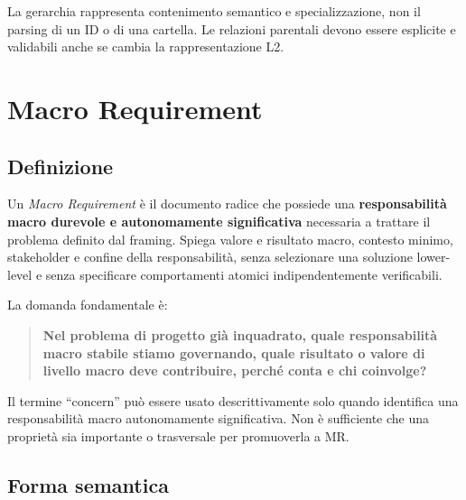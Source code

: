 \documentclass[12pt,a4paper,oneside]{report}
\newcommand{\mr}{\textit{Macro Requirement}}
\begin{document}
La gerarchia rappresenta contenimento semantico e specializzazione, non il parsing di un ID o di una cartella. Le relazioni parentali devono essere esplicite e validabili anche se cambia la rappresentazione L2.

\section{Macro Requirement}

\subsection{Definizione}

Un \mr{} è il documento radice che possiede una \textbf{responsabilità macro durevole e autonomamente significativa} necessaria a trattare il problema definito dal framing. Spiega valore e risultato macro, contesto minimo, stakeholder e confine della responsabilità, senza selezionare una soluzione lower-level e senza specificare comportamenti atomici indipendentemente verificabili.

La domanda fondamentale è:
\begin{quote}
\textbf{Nel problema di progetto già inquadrato, quale responsabilità macro stabile stiamo governando, quale risultato o valore di livello macro deve contribuire, perché conta e chi coinvolge?}
\end{quote}

Il termine ``concern'' può essere usato descrittivamente solo quando identifica una responsabilità macro autonomamente significativa. Non è sufficiente che una proprietà sia importante o trasversale per promuoverla a MR.

\subsection{Forma semantica}
\end{document}
